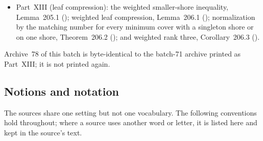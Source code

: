 \documentclass[11pt,a4paper]{article}
\theoremstyle{remark}\newtheorem{remark}[theorem]{Remark}
\begin{document}
\begin{itemize}
  number at unit weights for $\nu\le3$, Theorem~191.1
  (); the explicit rank-three bimatroid
  obstruction, Theorem~192.1 (); and a connected
  rank-four family, Theorem~196.1 ().
\item Part~XIII (leaf compression): the weighted smaller-shore inequality,
  Lemma~205.1 (); weighted leaf compression,
  Lemma~206.1 (); normalization by the matching
  number for every minimum cover with a singleton shore or on one shore,
  Theorem~206.2 (); and weighted rank three,
  Corollary~206.3 ().
\end{itemize}
Archive~78 of this batch is byte-identical to the batch-71 archive printed as
Part~XIII; it is not printed again.

\subsection{Notions and notation}\label{mrn:sec:notions}
The sources share one setting but not one vocabulary. The following
conventions hold throughout; where a source uses another word or letter,
it is listed here and kept in the source's text.
\end{document}
